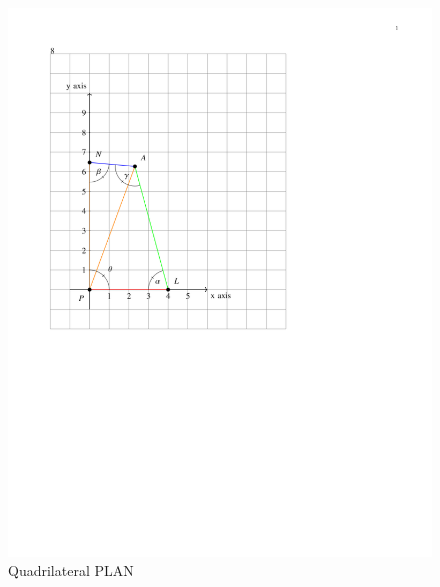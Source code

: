 \documentclass[journal,12pt,twocolumn]{IEEEtran}
\begin{document}
\begin{figure}[!ht]
\centering
\includegraphics[height=20 cm]{Fig_PLAN.png}
\caption{Quadrilateral PLAN}
\end{figure}
\end{document}
